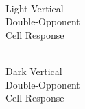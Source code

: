 \documentclass[journal,onecolumn]{IEEEtran}
\begin{document}
\begin{figure}[H]
\begin{subfigure}{0.15\textwidth}
        \caption{\\ Light Vertical\\ Double-Opponent\\ Cell Response}
    \end{subfigure}
    \begin{subfigure}{0.15\textwidth}
        \centering
        \captionsetup{justification=centering}
        \caption{\\ Dark Vertical\\ Double-Opponent\\ Cell Response}
    \end{subfigure}
    \begin{subfigure}{0.15\textwidth}
        \centering
        \captionsetup{justification=centering}

\end{subfigure}
\end{figure}
\end{document}
